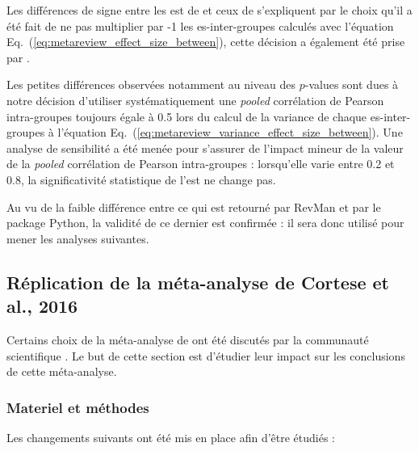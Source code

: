 Les différences de signe entre les \gls{est} de \citet{Cortese2016} et ceux de \citet{Bussalb2019clinical} s'expliquent par le choix qu'il a été fait de ne pas multiplier
par -1 les \gls{es}-inter-groupes calculés avec l'équation Eq.~(\ref{eq:metareview_effect_size_between}), cette décision a également été prise par 
\citet{Micoulaud2014}.

Les petites différences observées notamment au niveau des $p$-values sont dues à notre décision d'utiliser systématiquement une \textit{pooled} corrélation de Pearson 
intra-groupes toujours égale à 0.5 \citep{Balk2012} lors du calcul de la variance de chaque \gls{es}-inter-groupes à l'équation 
Eq.~(\ref{eq:metareview_variance_effect_size_between}). Une analyse de sensibilité a été menée pour s'assurer de l'impact mineur de la valeur de la \textit{pooled} 
corrélation de Pearson intra-groupes : lorsqu'elle varie entre 0.2 et 0.8, la significativité statistique de l'\gls{est} ne change pas.

Au vu de la faible différence entre ce qui est retourné par RevMan et par le package Python, la validité de ce dernier est confirmée : il sera donc utilisé pour mener
les analyses suivantes.

\subsection{Réplication de la méta-analyse de Cortese et al., 2016} \label{replication}

Certains choix de la méta-analyse de \citet{Cortese2016} ont été discutés par la communauté scientifique \citep{Micoulaud2016}. Le but de cette section est 
d'étudier leur impact sur les conclusions de cette méta-analyse.

\subsubsection{Materiel et méthodes}
Les changements suivants ont été mis en place afin d'être étudiés :


